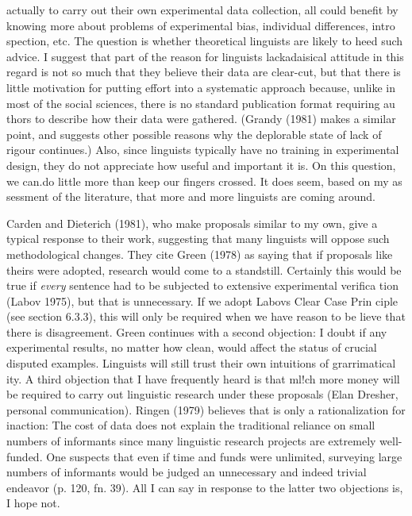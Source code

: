 \begin{styleStandard}
actually to carry out their own experimental data collection, all could benefit by knowing more about problems of experimental bias, individual differences, intro\- spection, etc. The question is whether theoretical linguists are likely to heed such advice. I suggest that part of the reason for linguists{\textquotesingle} lackadaisical attitude in this regard is not so much that they believe their data are clear-cut, but that there is little motivation for putting effort into a systematic approach because, unlike in most of the social sciences, there is no standard publication format requiring au\- thors to describe how their data were gathered. (Grandy (1981) makes a similar point, and suggests other possible reasons why the deplorable state of lack of rigour continues.) Also, since linguists typically have no training in experimental design, they do not appreciate how useful and important it is. On this question, we can.do little more than keep our fingers crossed. It does seem, based on my as\- sessment of the literature, that more and more linguists are coming around.
\end{styleStandard}


\begin{styleStandard}
Carden and Dieterich (1981), who make proposals similar to my own, give a typical response to their work, suggesting that many linguists will oppose such methodological changes. They cite Green (1978) as saying that if proposals like theirs were adopted, {\textquotedbl}research would come to a standstill.{\textquotedbl} Certainly this would be true if \textit{every}\textit{ }sentence had to be subjected to extensive experimental verifica\- tion (Labov 1975), but that is unnecessary. If we adopt Labov{\textquotesingle}s Clear Case Prin\- ciple (see section 6.3.3), this will only be required when we have reason to be\- lieve that there is disagreement. Green continues with a second objection: {\textquotedbl}I doubt if any experimental results, no matter how clean, would affect the status of crucial disputed examples. Linguists will still trust their own intuitions of grarrimatical\- ity.{\textquotedbl} A third objection that I have frequently heard is that ml!ch more money will be required to carry out linguistic research under these proposals (Elan Dresher, personal communication). Ringen (1979) believes that is only a rationalization for inaction: {\textquotedbl}The cost of data does not explain the traditional reliance on small numbers of informants since many linguistic research projects are extremely well-funded. One suspects that even if time and funds were unlimited, surveying large numbers of informants would be judged an unnecessary and indeed trivial endeavor{\textquotedbl} (p. 120, fn. 39). All I can say in response to the latter two objections is, I hope not.
\end{styleStandard}


